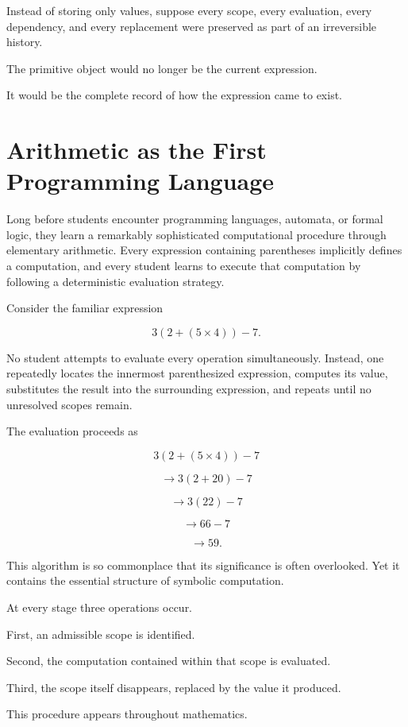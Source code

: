 \documentclass[12pt,oneside]{article}
\theoremstyle{definition}
\theoremstyle{remark}
\begin{document}
Instead of storing only values,
suppose every scope,
every evaluation,
every dependency,
and every replacement were preserved as part of an irreversible
history.

The primitive object would no longer be the current expression.

It would be the complete record of how the expression came to exist.

\section{Arithmetic as the First Programming Language}

Long before students encounter programming languages, automata, or formal
logic, they learn a remarkably sophisticated computational procedure through
elementary arithmetic. Every expression containing parentheses implicitly
defines a computation, and every student learns to execute that computation by
following a deterministic evaluation strategy.

Consider the familiar expression

\[
3\left(2 + (5 \times 4)\right) - 7.
\]

No student attempts to evaluate every operation simultaneously.
Instead, one repeatedly locates the innermost parenthesized expression,
computes its value, substitutes the result into the surrounding expression,
and repeats until no unresolved scopes remain.

The evaluation proceeds as

\[
3\left(2 + (5 \times 4)\right)-7
\]

\[
\longrightarrow
3(2+20)-7
\]

\[
\longrightarrow
3(22)-7
\]

\[
\longrightarrow
66-7
\]

\[
\longrightarrow
59.
\]

This algorithm is so commonplace that its significance is often overlooked.
Yet it contains the essential structure of symbolic computation.

At every stage three operations occur.

First, an admissible scope is identified.

Second, the computation contained within that scope is evaluated.

Third, the scope itself disappears, replaced by the value it produced.

This procedure appears throughout mathematics.
\end{document}
